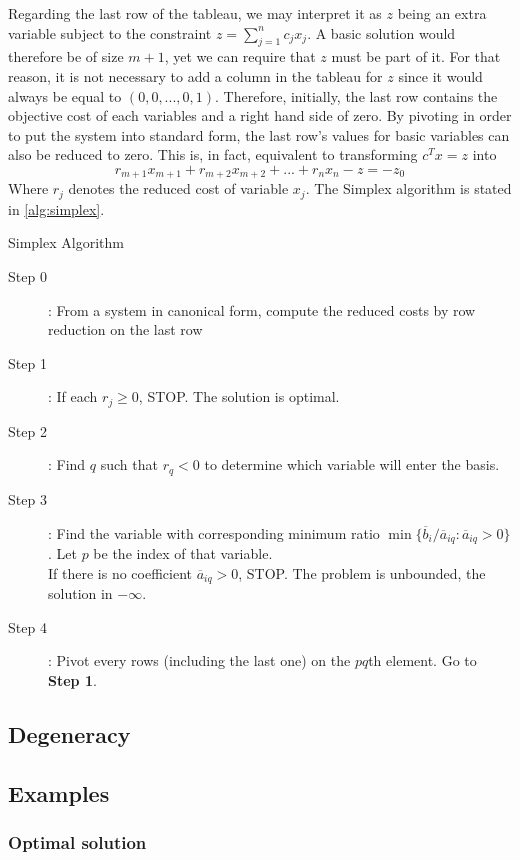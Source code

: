 Regarding the last row of the tableau, we may interpret it as $z$ being an extra variable subject to the constraint $z = \sum_{j=1}^n c_jx_j$. A basic solution would therefore be of size $m+1$, yet we can require that $z$ must be part of it. For that reason, it is not necessary to add a column in the tableau for $z$ since it would always be equal to $(0,0,...,0,1)$. Therefore, initially, the last row contains the objective cost of each variables and a right hand side of zero. By pivoting in order to put the system into standard form, the last row's values for basic variables can also be reduced to zero. This is, in fact, equivalent to transforming $c^Tx = z$ into \[ r_{m+1}x_{m+1} + r_{m+2}x_{m+2} + ... + r_nx_n - z = -z_0 \] Where $r_j$ denotes the reduced cost of variable $x_j$. The Simplex algorithm is stated in \ref{alg:simplex}. 

\begin{algorithm}[h!]
    \caption{Simplex Algorithm}
    \label{alg:simplex}
    \begin{description}
        \item[Step 0] : From a system in canonical form, compute the reduced costs by row reduction on the last row
        \item[Step 1] : If each $r_j \ge 0$, STOP. The solution is optimal.
        \item[Step 2] : Find $q$ such that $r_q < 0$ to determine which variable will enter the basis.
        \item[Step 3] : Find the variable with corresponding minimum ratio $\min\{ \overline b_i/\overline a_{iq} : \overline a_{iq} > 0 \}$. Let $p$ be the index of that variable.\\
        If there is no coefficient $\overline a_{iq} > 0$, STOP. The problem is unbounded, the solution in $-\infty$.
        \item[Step 4] : Pivot every rows (including the last one) on the $pq$th element. Go to \textbf{Step 1}.
    \end{description}
\end{algorithm}

\subsection{Degeneracy}
\subsection{Examples}
\subsubsection{Optimal solution}

